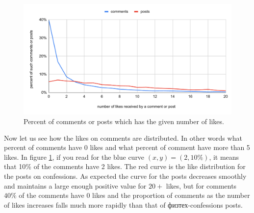 \documentclass[
	11pt
] {article}
\begin{document}
	\begin{figure}[H]
		\centering
		\includegraphics[width=1\textwidth]{fig-proportion-of-posts-or-comments-with-certain-likes}
		\caption{Percent of comments or posts which has the given number of likes.}
		\label{fig-proportion-of-posts-or-comments-with-certain-likes}
	\end{figure}
	Now let us see how the likes on comments are distributed. In other words what percent of comments have 0 likes and what percent of comment have more than 5 likes. In figure \ref{fig-proportion-of-posts-or-comments-with-certain-likes}, if you read for the blue curve $(x, y) = (2, 10\%)$, it means that \num{10}\% of the comments have \num{2} likes. The red curve is the like distribution for the posts on confessions. As expected the curve for the posts decreases smoothly and maintains a large enough positive value for $\num{20} + $ likes, but for comments $\num{40}\%$ of the comments have 0 likes and the proportion of comments as the number of likes increases falls much more rapidly than that of физтех-confessions posts.
\end{document}

